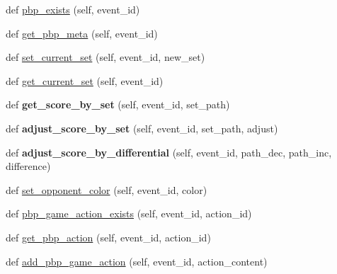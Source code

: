 \begin{DoxyCompactItemize}
\item 
def \hyperlink{classhandler_1_1dao_1_1pbp__dao_1_1_p_b_p_dao_ac288ed20d35ef9ececdb529a1d78bd18}{pbp\+\_\+exists} (self, event\+\_\+id)
\item 
def \hyperlink{classhandler_1_1dao_1_1pbp__dao_1_1_p_b_p_dao_ab1bdedda8cf62dc923c4edc53ac96e62}{get\+\_\+pbp\+\_\+meta} (self, event\+\_\+id)
\item 
def \hyperlink{classhandler_1_1dao_1_1pbp__dao_1_1_p_b_p_dao_a4f1b438b7950a4faa505749891b52be3}{set\+\_\+current\+\_\+set} (self, event\+\_\+id, new\+\_\+set)
\item 
def \hyperlink{classhandler_1_1dao_1_1pbp__dao_1_1_p_b_p_dao_a984f75760da8e0d09012da4d0c7d0773}{get\+\_\+current\+\_\+set} (self, event\+\_\+id)
\item 
\mbox{\label{classhandler_1_1dao_1_1pbp__dao_1_1_p_b_p_dao_ac8879850abd651cb630c07d1a815bfd3}} 
def {\bfseries get\+\_\+score\+\_\+by\+\_\+set} (self, event\+\_\+id, set\+\_\+path)
\item 
\mbox{\label{classhandler_1_1dao_1_1pbp__dao_1_1_p_b_p_dao_af961896d0acb7696c5f02ac825bb05b1}} 
def {\bfseries adjust\+\_\+score\+\_\+by\+\_\+set} (self, event\+\_\+id, set\+\_\+path, adjust)
\item 
\mbox{\label{classhandler_1_1dao_1_1pbp__dao_1_1_p_b_p_dao_a95ea3aaec740ccbb4fb5d5c07b0439e0}} 
def {\bfseries adjust\+\_\+score\+\_\+by\+\_\+differential} (self, event\+\_\+id, path\+\_\+dec, path\+\_\+inc, difference)
\item 
def \hyperlink{classhandler_1_1dao_1_1pbp__dao_1_1_p_b_p_dao_a46a33bcdaf5e87326884d2f05d3280a8}{set\+\_\+opponent\+\_\+color} (self, event\+\_\+id, color)
\item 
def \hyperlink{classhandler_1_1dao_1_1pbp__dao_1_1_p_b_p_dao_a8fba96941656e377125457deb83140d6}{pbp\+\_\+game\+\_\+action\+\_\+exists} (self, event\+\_\+id, action\+\_\+id)
\item 
def \hyperlink{classhandler_1_1dao_1_1pbp__dao_1_1_p_b_p_dao_ab64fb33991baf49a73cc8a5180b8b74e}{get\+\_\+pbp\+\_\+action} (self, event\+\_\+id, action\+\_\+id)
\item 
def \hyperlink{classhandler_1_1dao_1_1pbp__dao_1_1_p_b_p_dao_a7faa4be8c78c01da5c4abc9a2bf97a0b}{add\+\_\+pbp\+\_\+game\+\_\+action} (self, event\+\_\+id, action\+\_\+content)

\end{DoxyCompactItemize}
